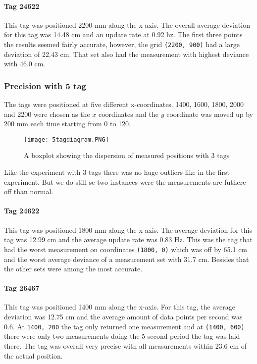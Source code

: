\paragraph{Tag 24622}
This tag was positioned 2200 mm along the x-axis.
The overall average deviation for this tag was 14.48 cm and an update rate at 0.92 hz.
The first three points the results seemed fairly accurate, however, the grid \texttt{(2200, 900)} had a large deviation of 22.43 cm.
That set also had the measurement with highest deviance with 46.0 cm.

\subsubsection{Precision with 5 tag}
The tags were positioned at five different x-coordinates. 
1400, 1600, 1800, 2000 and 2200 were chosen as the $x$ coordinates and the $y$ coordinate was moved up by 200 mm each time starting from 0 to 120.
\begin{figure}[H]
    \centering
    \texttt{[image: 5tagdiagram.PNG]}
    \caption{A boxplot showing the dispersion of measured positions with 3 tags}
    \label{fig:5tagdiagram}
\end{figure}
Like the experiment with 3 tags there was no huge outliers like in the first experiment.
But we do still se two instances were the measurements are futhere off than normal.


\paragraph{Tag 24622}
This tag was positioned 1800 mm along the x-axis.
The average deviation for this tag was 12.99 cm and the average update rate was 0.83 Hz.
This was the tag that had the worst measurement on coordinates \texttt{(1800, 0)} which was off by 65.1 cm and the worst average deviance of a measurement set with 31.7 cm.
Besides that the other sets were among the most accurate.

\paragraph{Tag 26467}
This tag was positioned 1400 mm along the x-axis.
For this tag, the average deviation was 12.75 cm and the average amount of data points per second was 0.6.
At \texttt{1400, 200} the tag only returned one measurement and at \texttt{(1400, 600)} there were only two measurements doing the 5 second period the tag was laid there.
The tag was overall very precise with all measurements within 23.6 cm of the actual position.

